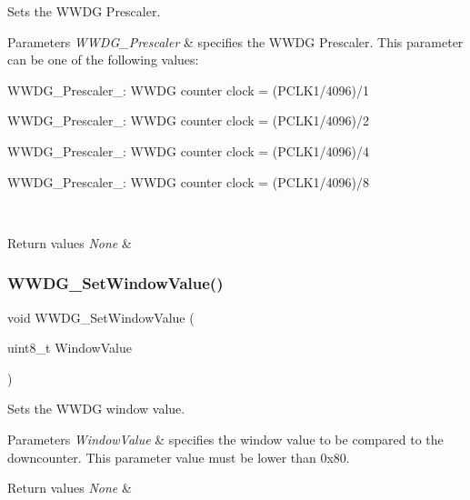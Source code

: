 Sets the W\+W\+DG Prescaler. 


\begin{DoxyParams}{Parameters}
{\em W\+W\+D\+G\+\_\+\+Prescaler} & specifies the W\+W\+DG Prescaler. This parameter can be one of the following values\+: \begin{DoxyItemize}
\item W\+W\+D\+G\+\_\+\+Prescaler\+\_\+: W\+W\+DG counter clock = (P\+C\+L\+K1/4096)/1 \item W\+W\+D\+G\+\_\+\+Prescaler\+\_\+: W\+W\+DG counter clock = (P\+C\+L\+K1/4096)/2 \item W\+W\+D\+G\+\_\+\+Prescaler\+\_\+: W\+W\+DG counter clock = (P\+C\+L\+K1/4096)/4 \item W\+W\+D\+G\+\_\+\+Prescaler\+\_\+: W\+W\+DG counter clock = (P\+C\+L\+K1/4096)/8 \end{DoxyItemize}
\\
\hline
\end{DoxyParams}

\begin{DoxyRetVals}{Return values}
{\em None} & \\
\hline
\end{DoxyRetVals}
\mbox{\label{group___w_w_d_g___private___functions_gaf44a7bf8bf6b11b41cd89ff521fdd5a5}} 
\subsubsection{\texorpdfstring{WWDG\_SetWindowValue()}{WWDG\_SetWindowValue()}}
{\footnotesize\ttfamily void W\+W\+D\+G\+\_\+\+Set\+Window\+Value (\begin{DoxyParamCaption}\item[{uint8\+\_\+t}]{Window\+Value }\end{DoxyParamCaption})}



Sets the W\+W\+DG window value. 


\begin{DoxyParams}{Parameters}
{\em Window\+Value} & specifies the window value to be compared to the downcounter. This parameter value must be lower than 0x80. \\
\hline
\end{DoxyParams}

\begin{DoxyRetVals}{Return values}
{\em None} & \\
\hline
\end{DoxyRetVals}
